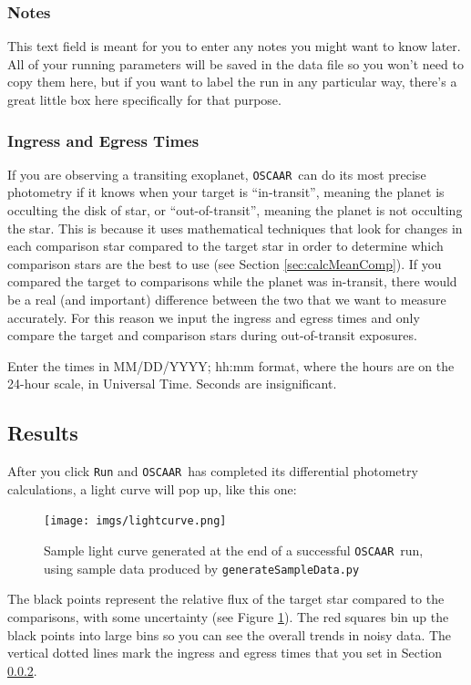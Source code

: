 \documentclass[a4paper]{article}
\newcommand{\code}[1]{\texttt{#1}}
\newcommand{\oscaar}{\code{OSCAAR}~}
\begin{document}
\subsubsection{Notes}
This text field is meant for you to enter any notes you might want to know later. All of your running parameters will be saved in the data file so you won't need to copy them here, but if you want to label the run in any particular way, there's a great little box here specifically for that purpose.

\subsubsection{Ingress and Egress Times} \label{sec:ingEgr}
If you are observing a transiting exoplanet, \oscaar can do its most precise photometry if it knows when your target is ``in-transit'', meaning the planet is occulting the disk of star, or ``out-of-transit'', meaning the planet is not occulting the star. This is because it uses mathematical techniques that look for changes in each comparison star compared to the target star in order to determine which comparison stars are the best to use (see Section \ref{sec:calcMeanComp}). If you compared the target to comparisons while the planet was in-transit, there would be a real (and important) difference between the two that we want to measure accurately. For this reason we input the ingress and egress times and only compare the target and comparison stars during out-of-transit exposures.

Enter the times in MM/DD/YYYY;  hh:mm format, where the hours are on the 24-hour scale, in Universal Time. Seconds are insignificant.

\subsection{Results}
After you click \code{Run} and \oscaar has completed its differential photometry calculations, a light curve will pop up, like this one:
\begin{figure}[H]
\begin{center}
\texttt{[image: imgs/lightcurve.png]}
\caption{Sample light curve generated at the end of a successful \oscaar run, using sample data produced by \code{generateSampleData.py}}
\label{fig:lightcurve}
\end{center}	
\end{figure}
The black points represent the relative flux of the target star compared to the comparisons, with some uncertainty (see Figure \ref{fig:lightcurve}). The red squares bin up the black points into large bins so you can see the overall trends in noisy data. The vertical dotted lines mark the ingress and egress times that you set in Section \ref{sec:ingEgr}. 
\end{document}
